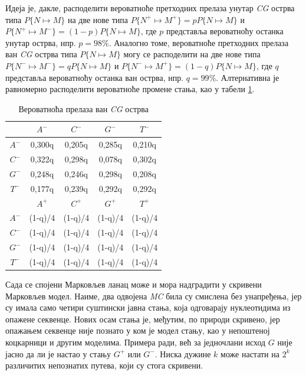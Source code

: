 \documentclass[12pt,oneside]{memoir}
\begin{document}
\begin{CJK}{UTF8}{ipxm}
Идеја је, дакле, расподелити вероватноће претходних прелаза унутар \textit{CG} острва типа $P\{N \mapsto M\}$ на две нове типа $P\{N^+ \mapsto M^+\} = p P\{N \mapsto M\}$ и $P\{N^+ \mapsto M^-\} = (1-p) P\{N \mapsto M\}$, где $p$ представља вероватноћу останка унутар острва, нпр. $p = 98\%$. Аналогно томе, вероватноће претходних прелаза ван \textit{CG} острва типа $P\{N \mapsto M\}$ могу се расподелити на две нове типа $P\{N^- \mapsto M^-\} = q P\{N \mapsto M\}$ и $P\{N^- \mapsto M^+\} = (1-q) P\{N \mapsto M\}$, где $q$ представља вероватноћу останка ван острва, нпр. $q = 99\%$. Алтернативна је равномерно расподелити вероватноће промене стања, као у табели \ref{tab:cg_hmm2}.

\begin{table}[h!]
  \centering
  \caption{Вероватноћа прелаза ван \textit{CG} острва}
  \begin{tabular}{| c | c c c c |} \hline
   & $A^-$ & $C^-$ & $G^-$ & $T^-$ \\ \hline
  $A^-$ & 0,300q & 0,205q & 0,285q & 0,210q \\
  $C^-$ & 0,322q & 0,298q & 0,078q & 0,302q \\
  $G^-$ & 0,248q & 0,246q & 0,298q & 0,208q \\
  $T^-$ & 0,177q & 0,239q & 0,292q & 0,292q \\ \hhline{= | = = = =}
   & $A^+$ & $C^+$ & $G^+$ & $T^+$ \\ \hline
  $A^-$ & (1-q)/4 & (1-q)/4 & (1-q)/4 & (1-q)/4 \\
  $C^-$ & (1-q)/4 & (1-q)/4 & (1-q)/4 & (1-q)/4 \\
  $G^-$ & (1-q)/4 & (1-q)/4 & (1-q)/4 & (1-q)/4 \\
  $T^-$ & (1-q)/4 & (1-q)/4 & (1-q)/4 & (1-q)/4 \\ \hline
  \end{tabular}
  \label{tab:cg_hmm2}
\end{table}

Сада се спојени Марковљев ланац може и мора надградити у скривени Марковљев модел. Наиме, два одвојена \textit{MC} била су смислена без унапређења, јер су имала само четири суштински јавна стања, која одговарају нуклеотидима из опажене секвенце. Нових осам стања је, међутим, по природи скривено, јер опажањем секвенце није познато у ком је модел стању, као у непоштеној коцкарници и другим моделима. Примера ради, већ за једночлани исход $G$ није јасно да ли је настао у стању $G^+$ или $G^-$. Ниска дужине $k$ може настати на $2^k$ различитих непознатих путева, који су стога скривени.


\end{CJK}
\end{document}
